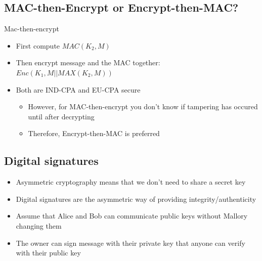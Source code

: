 \documentclass[12pt,a4paper]{article}
\begin{document}
\subsection{MAC-then-Encrypt or Encrypt-then-MAC?}
Mac-then-encrypt
\begin{itemize}
    \item First compute $MAC(K_2, M)$ 
    \item Then encrypt message and the MAC together: $Enc(K_1, M || MAX(K_2, M))$
    \item Both are IND-CPA and EU-CPA secure 
    \begin{itemize}
        \item However, for MAC-then-encrypt you don't know if tampering has occured until after decrypting
        \item Therefore, Encrypt-then-MAC is preferred
    \end{itemize}
\end{itemize}

\subsection{Digital signatures}
\begin{itemize}
    \item Asymmetric cryptography means that we don't need to share a secret key
    \item Digital signatures are the asymmetric way of providing integrity/authenticity
    \item Assume that Alice and Bob can communicate public keys without Mallory changing them
    \item The owner can sign message with their private key that anyone can verify with their public key
\end{itemize}
\end{document}

